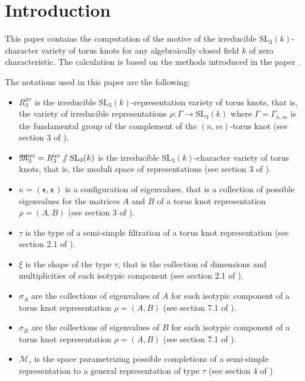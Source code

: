 \documentclass[10pt,a4paper]{amsart}
\begin{document}
\section*{Introduction}

\vspace{-0.05cm}

This paper contains the computation of the motive of the irreducible $\mathrm{SL}_{3}(k)$-character variety of torus knots for any algebraically closed field $k$ of zero characteristic. The calculation is based on the methods introduced in the paper \cite{GPM}. 

The notations used in this paper are the following:
\begin{itemize}
	\item $R_{3}^{\textrm{irr}}$ is the irreducible $\mathrm{SL}_{3}(k)$-representation variety of torus knots, that is, the variety of irreducible representations $\rho: \Gamma \to \mathrm{SL}_{3}(k)$ where $\Gamma = \Gamma_{n,m}$ is the fundamental group of the complement of the $(n,m)$-torus knot (see section {3} of \cite{GPM}).
	\item ${\frak M}_{3}^{\textrm{irr}} = R_{3}^{\textrm{irr}} \sslash \mathrm{SL}_{3}(k)$ is the irreducible $\mathrm{SL}_{3}(k)$-character variety of torus knots, that is, the moduli space of representations (see section {3} of \cite{GPM}).
	\item $\kappa = (\bm{\epsilon}, \bm{\varepsilon})$ is a configuration of eigenvalues, that is a collection of possible eigenvalues for the matrices $A$ and $B$ of a torus knot representation $\rho = (A,B)$ (see section {3} of \cite{GPM}).
	\item $\tau$ is the type of a semi-simple filtration of a torus knot representation (see section 2.1 of \cite{GPM}).
	\item $\xi$ is the shape of the type $\tau$, that is the collection of dimensions and multiplicities of each isotypic component (see section 2.1 of \cite{GPM}).
	\item $\sigma_A$ are the collections of eigenvalues of $A$ for each isotypic component of a torus knot representation $\rho = (A,B)$ (see section 7.1 of \cite{GPM}).
	\item $\sigma_B$ are the collections of eigenvalues of $B$ for each isotypic component of a torus knot representation $\rho = (A,B)$ (see section 7.1 of \cite{GPM}).
	\item $\mathcal{M}_{\tau}$ is the space parametrizing possible completions of a semi-simple representation to a general representation of type $\tau$ (see section 4 of \cite{GPM})

\end{itemize}
\end{document}
